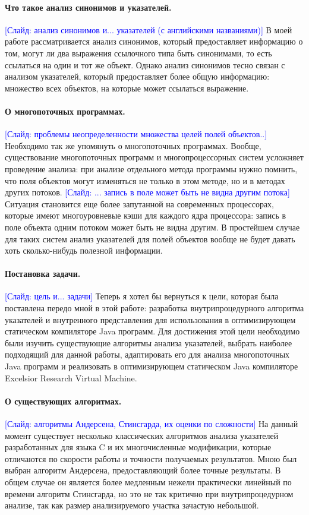 \documentclass[12pt]{article}
\newcommand{\slide}[1]{\textcolor{Blue}{[Слайд: #1]}}
\newcommand{\eng}[1]{{\English#1}}
\begin{document}
  \paragraph{Что такое анализ синонимов и указателей.}
  \slide{анализ синонимов и... указателей (с английскими названиями)}
  В моей работе рассматривается анализ синонимов, который предоставляет
  информацию о том, могут ли два выражения ссылочного типа быть синонимами, то
  есть ссылаться на один и тот же объект. Однако анализ синонимов тесно связан
  с анализом указателей, который предоставляет более общую информацию:
  множество всех объектов, на которые может ссылаться выражение.

  \paragraph{О многопоточных программах.}
  \slide{проблемы неопределенности множества целей полей объектов..}
  Необходимо так же упомянуть о многопоточных программах. Вообще,
  существование многопоточных программ и многопроцессорных систем усложняет
  проведение анализа: при анализе отдельного метода программы нужно помнить,
  что поля объектов могут изменяться не только в этом методе, но и в методах
  других потоков.
  \slide{... запись в поле может быть не видна другим потока}
  Ситуация становится еще более запутанной на современных процессорах, которые
  имеют многоуровневые кэши для каждого ядра процессора: запись в поле объекта
  одним потоком может быть не видна другим.
  В простейшем случае для таких систем анализ указателей для полей объектов
  вообще не будет давать хоть сколько-нибудь полезной информации.

  \paragraph{Постановка задачи.}
  \slide{цель и... задачи}
  Теперь я хотел бы вернуться к цели, которая была поставлена передо мной в
  этой работе: разработка внутрипроцедурного алгоритма указателей и внутренного
  представления для использования в оптимизирующем статическом компиляторе Java
  программ. Для достижения этой цели необходимо были изучить существующие
  алгоритмы анализа указателей, выбрать наиболее подходящий для данной работы,
  адаптировать его для анализа многопоточных Java программ и реализовать в
  оптимизирующем статическом Java компиляторе \eng{Excelsior Research Virtual
  Machine}.

  \paragraph{О существующих алгоритмах.}
  \slide{алгоритмы Андерсена, Стинс\-гар\-да, их оценки по сложности}
  На данный момент существует несколько классических алгоритмов анализа
  указателей разработанных для языка C и их многочисленные модификации, которые
  отличаются по скорости работы и точности получаемых результатов. Мною был
  выбран алгоритм Андерсена, предоставляющий более точные результаты. В общем
  случае он является более медленным нежели практически линейный по времени
  алгоритм Стинсгарда, но это не так критично при внутрипроцедурном анализе,
  так как размер анализируемого участка зачастую небольшой.
\end{document}
